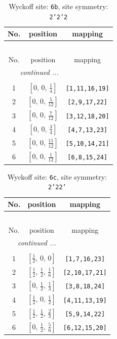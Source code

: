 \documentclass[fleqn,8pt]{jsarticle}
\begin{document}
\begin{longtable}{ccc}
\caption{Wyckoff site: {\tt 6b}, site symmetry: {\tt 2'2'2}}
 \\
 \hline \hline
No. & position & mapping \\ \hline \endfirsthead

\multicolumn{2}{l}{\tablename\ \thetable{}} \\
 \hline \hline
No. & position & mapping \\ \hline \endhead

 \hline \hline
\multicolumn{2}{r}{\footnotesize\it continued ...} \\ \endfoot

 \hline \hline
\multicolumn{2}{r}{} \\ \endlastfoot

1 & $\left[ 0,\, 0,\, \frac{1}{4} \right]$ & {\tt [1,11,16,19]} \\ \hline
2 & $\left[ 0,\, 0,\, \frac{5}{12} \right]$ & {\tt [2,9,17,22]} \\ \hline
3 & $\left[ 0,\, 0,\, \frac{7}{12} \right]$ & {\tt [3,12,18,20]} \\ \hline
4 & $\left[ 0,\, 0,\, \frac{3}{4} \right]$ & {\tt [4,7,13,23]} \\ \hline
5 & $\left[ 0,\, 0,\, \frac{11}{12} \right]$ & {\tt [5,10,14,21]} \\ \hline
6 & $\left[ 0,\, 0,\, \frac{1}{12} \right]$ & {\tt [6,8,15,24]} \\
\end{longtable}
\renewcommand{\arraystretch}{1.2}
\begin{longtable}{ccc}
\caption{Wyckoff site: {\tt 6c}, site symmetry: {\tt 2'22'}}
 \\
 \hline \hline
No. & position & mapping \\ \hline \endfirsthead

\multicolumn{2}{l}{\tablename\ \thetable{}} \\
 \hline \hline
No. & position & mapping \\ \hline \endhead

 \hline \hline
\multicolumn{2}{r}{\footnotesize\it continued ...} \\ \endfoot

 \hline \hline
\multicolumn{2}{r}{} \\ \endlastfoot

1 & $\left[ \frac{1}{2},\, 0,\, 0 \right]$ & {\tt [1,7,16,23]} \\ \hline
2 & $\left[ \frac{1}{2},\, \frac{1}{2},\, \frac{1}{6} \right]$ & {\tt [2,10,17,21]} \\ \hline
3 & $\left[ 0,\, \frac{1}{2},\, \frac{1}{3} \right]$ & {\tt [3,8,18,24]} \\ \hline
4 & $\left[ \frac{1}{2},\, 0,\, \frac{1}{2} \right]$ & {\tt [4,11,13,19]} \\ \hline
5 & $\left[ \frac{1}{2},\, \frac{1}{2},\, \frac{2}{3} \right]$ & {\tt [5,9,14,22]} \\ \hline
6 & $\left[ 0,\, \frac{1}{2},\, \frac{5}{6} \right]$ & {\tt [6,12,15,20]} \\
\end{longtable}
\end{document}
